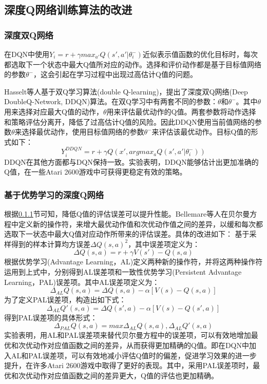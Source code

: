 \documentclass[bachelor]{thesis-uestc}
\begin{document}
	\subsection{深度Q网络训练算法的改进}
	\subsubsection{深度双Q网络}\label{sec1}
	在DQN中使用$Y_i=r+\gamma max_{a'}Q(s',a'|\theta_i^-)$近似表示值函数的优化目标时，每次都选取下一个状态中最大Q值所对应的动作。选择和评价动作都是基于目标值网络的参数$\theta^-$，这会引起在学习过程中出现过高估计Q值的问题。
	
	Hasselt等人\cite{van2016deep}基于双Q学习算法(double Q-learning)，提出了深度双Q网络(Deep DoubleQ-Network, DDQN)算法。在双Q学习中有两套不同的参数：$\theta$和$\theta^-$。其中$\theta$用来选择对应最大Q值的动作，$\theta$用来评估最优动作的Q值。两套参数将动作选择和策略评估分离开，降低了过高估计Q值的风险。因此DDQN使用当前值网络的参数$\theta$来选择最优动作，使用目标值网络的参数$\theta^-$来评估该最优动作。目标Q值的形式如下：
	\begin{equation}
		\label{eq8}
		Y_i^{DDQN}=r+\gamma Q(x',argmax_a Q(s',a'|\theta_i^-))
	\end{equation}
	DDQN在其他方面都与DQN保持一致。实验表明，DDQN能够估计出更加准确的Q值，在一些Atari 2600游戏中可获得更稳定有效的策略。
	
	\subsubsection{基于优势学习的深度Q网络}
	根据\ref{sec1}节可知，降低Q值的评估误差可以提升性能。Bellemare等人\cite{bellemare2016increasing}在贝尔曼方程中定义新的操作符，来增大最优动作值和次优动作值之间的差异，以缓和每次都选取下一状态中最大Q值对应动作所带来的评估误差。具体的改进如下：
	基于采样得到的样本计算均方误差$\Delta Q(s,a)^2$，其中误差项定义为：
	\begin{equation}
		\label{eq9}
		\Delta Q(s,a)=r+\gamma V(s')-Q(s,a)
	\end{equation}
	根据优势学习(Advantage Learning，AL)定义两种新的操作符，并将这两种操作符运用到上式中，分别得到AL误差项和一致性优势学习(Persistent Advantage Learning，PAL)误差项。其中AL误差项定义为：
	\begin{equation}
		\label{eq10}
		\Delta_{AL}Q(s,a)=\Delta Q(s,a)-\alpha[V(s)-Q(s,a)]
	\end{equation}
	为了定义PAL误差项，构造出如下式：
	\begin{equation}
		\label{eq11}
		\Delta_{AL}Q'(s,a)=\Delta Q(s',a)-\alpha[V(s)-Q(s',a)]
	\end{equation}
	得到PAL误差项的具体形式：
	\begin{equation}
		\label{eq12}
		\Delta_{PAL}Q(s,a)=max{\Delta_{AL}Q(s,a),\Delta_{AL}Q'(s,a)}
	\end{equation}
	实验表明，用AL和PAL误差项来替代贝尔曼方程中的误差项，可以有效地增加最优和次优动作对应值函数之间的差异，从而获得更加精确的Q值。即在DQN中加入AL和PAL误差项，可以有效地减小评估Q值时的偏差，促进学习效果的进一步提升，在许多Atari 2600游戏中取得了更好的表现。其中，采用PAL误差项时，最优和次优动作对应值函数之间的差异更大，Q值的评估也更加精确。
	
\end{document}
